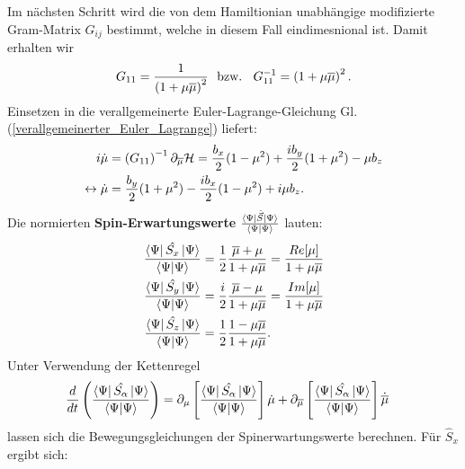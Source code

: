 \noindent Im nächsten Schritt wird die von dem Hamiltionian unabhängige modifizierte Gram-Matrix $G_{ij}$ bestimmt, 
welche in diesem Fall eindimesnional ist.
Damit erhalten wir
\begin{align}
    G_{11} = \frac{1}{\left(1 + \mu\overline{\mu}\right)^2} \text{\space\space bzw.\space\space } G_{11}^{-1} = \left(1 + \mu\overline{\mu}\right)^2 .
\end{align}
\noindent Einsetzen in die verallgemeinerte Euler-Lagrange-Gleichung Gl. (\ref{verallgemeinerter_Euler_Lagrange}) liefert:
\begin{align}
    i\dot{\mu} &=  \left(G_{11}\right)^{-1}\partial_{\overline{\mu}} \mathcal{H} = \frac{b_x}{2}(1-\mu^2) + \frac{i b_y }{2}(1+\mu^2) -\mu b_z\label{Larmor}\\
    \leftrightarrow \dot{\mu} &= \frac{ b_y }{2}(1+\mu^2) - \frac{ib_x}{2}(1-\mu^2)   + i\mu b_z .
\end{align}
Die normierten \textbf{Spin-Erwartungswerte} $\frac{\bra{\Psi}\hat{\vec{S}}\ket{\Psi}}{\bra{\Psi}\ket{\Psi}}$ lauten:
\begin{align}
    \frac{\bra{\Psi}\hat{S_x}\ket{\Psi}}{\bra{\Psi}\ket{\Psi}} &= \frac{1}{2}\frac{\overline{\mu} + \mu}{1+\mu\overline{\mu}} = \frac{Re[\mu]}{1 + \mu\overline{\mu}} \\
    \frac{\bra{\Psi}\hat{S_y}\ket{\Psi}}{\bra{\Psi}\ket{\Psi}} &= \frac{i}{2}\frac{\overline{\mu} - \mu}{1+\mu\overline{\mu}} = \frac{Im[\mu]}{1 + \mu\overline{\mu}} \\
    \frac{\bra{\Psi}\hat{S_z}\ket{\Psi}}{\bra{\Psi}\ket{\Psi}} &= \frac{1}{2}\frac{1 - \mu\overline{\mu}}{1 + \mu\overline{\mu}}  .
\end{align}
Unter Verwendung der Kettenregel 
\begin{align}
    \frac{d}{dt}\left(\frac{\bra{\Psi}\hat{S_\alpha}\ket{\Psi}}{\bra{\Psi}\ket{\Psi}}\right) &= \partial_{\mu}\left[\frac{\bra{\Psi}\hat{S_\alpha}\ket{\Psi}}{\bra{\Psi}\ket{\Psi}}\right]\dot{\mu} 
    + \partial_{\overline{\mu}}\left[\frac{\bra{\Psi}\hat{S_\alpha}\ket{\Psi}}{\bra{\Psi}\ket{\Psi}}\right]\dot{\overline{\mu}}\label{dS_dt}
\end{align}
lassen sich die Bewegungsgleichungen der Spinerwartungswerte berechnen. Für $\hat{S}_x$ ergibt sich:
